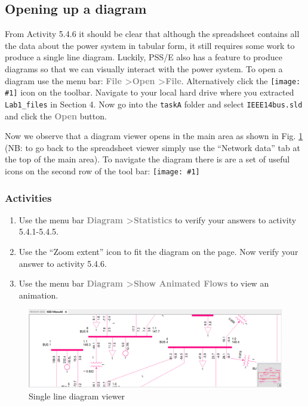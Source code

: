 \documentclass[paper=a4, fontsize=11pt]{article}
\newcommand{\mychar}[1]{%
  \begingroup\normalfont
  \texttt{[image: \#1]}%
  \endgroup
}
\begin{document}
\newpage
\subsection{Opening up a diagram}
From Activity 5.4.6 it should be clear that although the spreadsheet contains all the data about the power system in tabular form, it still requires some work to produce a single line diagram. Luckily, PSS/E also has a feature to produce diagrams so that we can visually interact with the power system. To open a diagram use the menu bar: \textbf{\textcolor{gray}{File \textgreater \phantom{ }Open \textgreater \phantom{ }File}}. Alternatively click the \mychar{open.png} icon on the toolbar. Navigate to your local hard drive where you extracted \texttt{Lab1\_files} in Section 4. Now go into the \texttt{taskA} folder and select \texttt{IEEE14bus.sld} and click the \textbf{\textcolor{gray}{Open}} button.

Now we observe that a diagram viewer opens in the main area as shown in Fig. \ref{fig:6} (NB: to go back to the spreadsheet viewer simply use the ``Network data'' tab at the top of the main area). To navigate the diagram there is are a set of useful icons on the second row of the tool bar: \mychar{zoom.png}

\subsubsection*{Activities}
\begin{enumerate}
\item[\textbf{5.5.1}] Use the menu bar \textbf{\textcolor{gray}{Diagram \textgreater \phantom{ }Statistics}} to verify your answers to activity 5.4.1-5.4.5.
\item[\textbf{5.5.2}] Use the ``Zoom extent'' icon to fit the diagram on the page. Now verify your answer to activity 5.4.6.
\item[\textbf{5.5.3}] Use the menu bar \textbf{\textcolor{gray}{Diagram \textgreater \phantom{ }Show Animated Flows}} to view an animation.
\end{enumerate}

\begin{figure}[t]
\centering
\includegraphics[scale=0.32]{fig6_sldviewer.pdf}
\caption{Single line diagram viewer}
\label{fig:6}
\end{figure}
\end{document}
